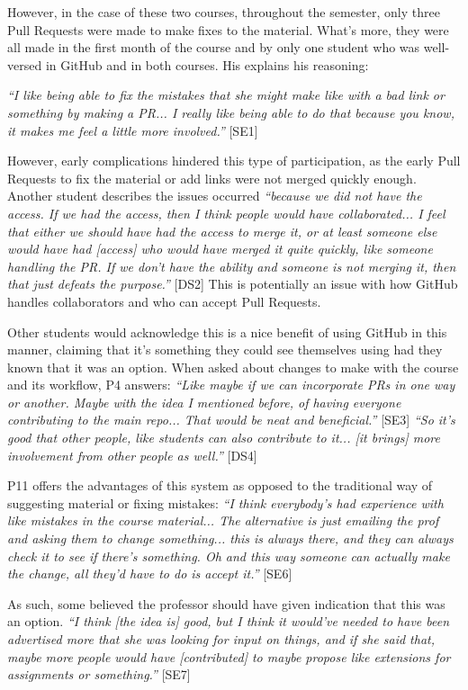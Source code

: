 However, in the case of these two courses, throughout the semester, only three Pull Requests were made to make fixes to the material. What's more, they were all made in the first month of the course and by only one student who was well-versed in GitHub and in both courses. His explains his reasoning:

\textit{``I like being able to fix the mistakes that she might make like with a bad link or something by making a PR... I really like being able to do that because you know, it makes me feel a little more involved.''} [SE1]

However, early complications hindered this type of participation, as the early Pull Requests to fix the material or add links were not merged quickly enough. Another student describes the issues occurred \textit{``because we did not have the access. If we had the access, then I think people would have collaborated... I feel that either we should have had the access to merge it, or at least someone else would have had [access] who would have merged it quite quickly, like someone handling the PR. If we don't have the ability and someone is not merging it, then that just defeats the purpose.''} [DS2] This is potentially an issue with how GitHub handles collaborators and who can accept Pull Requests.

Other students would acknowledge this is a nice benefit of using GitHub in this manner, claiming that it's something they could see themselves using had they known that it was an option. When asked about changes to make with the course and its workflow, P4 answers: \textit{``Like maybe if we can incorporate PRs in one way or another. Maybe with the idea I mentioned before, of having everyone contributing to the main repo... That would be neat and beneficial.''} [SE3] \textit{``So it's good that other people, like students can also contribute to it... [it brings] more involvement from other people as well.''} [DS4]

P11 offers the advantages of this system as opposed to the traditional way of suggesting material or fixing mistakes: \textit{``I think everybody's had experience with like mistakes in the course material... The alternative is just emailing the prof and asking them to change something... this is always there, and they can always check it to see if there's something. Oh and this way someone can actually make the change, all they'd have to do is accept it.''} [SE6]

As such, some believed the professor should have given indication that this was an option. \textit{``I think [the idea is] good, but I think it would've needed to have been advertised more that she was looking for input on things, and if she said that, maybe more people would have [contributed] to maybe propose like extensions for assignments or something.''} [SE7]

